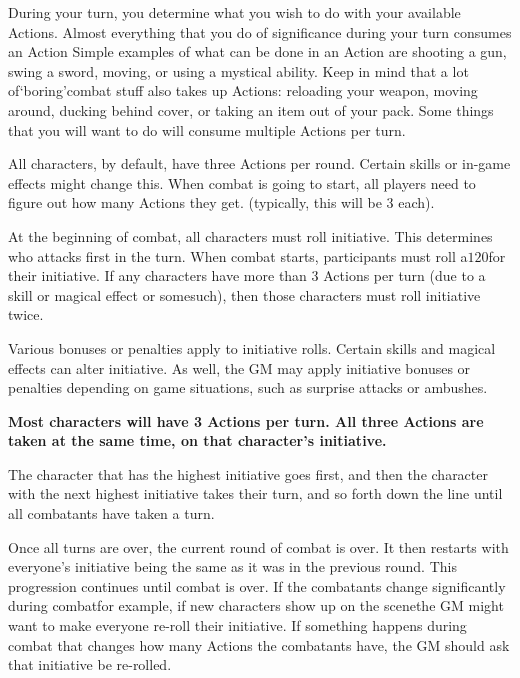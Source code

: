 \documentclass[twoside]{book}
\begin{document}
    {  
    During your turn, you determine what you wish to do with your available Actions. Almost everything that you do of significance during your turn consumes an Action Simple examples of what can be done in an Action are shooting a gun, swing a sword, moving, or using a mystical ability. Keep in mind that a lot of`boring'combat stuff also takes up Actions: reloading your weapon, moving around, ducking behind cover, or taking an item out of your pack. Some things that you will want to do will consume multiple Actions per turn.
    }
  
    {  
    All characters, by default, have three Actions per round. Certain skills or in-game effects might change this. When combat is going to start, all players need to figure out how many Actions they get. (typically, this will be 3 each).
    }
  
    {  
    At the beginning of combat, all characters must roll initiative. This determines who attacks first in the turn. When combat starts, participants must roll a\ensuremath{1}\ensuremath{20}\ensuremath{}for their initiative. If any characters have more than 3 Actions per turn (due to a skill or magical effect or somesuch), then those characters must roll initiative twice.
    }
  
    {  
    Various bonuses or penalties apply to initiative rolls. Certain skills and magical effects can alter initiative. As well, the GM may apply initiative bonuses or penalties depending on game situations, such as surprise attacks or ambushes.
    }
  

 \textbf{Most characters will have 3 Actions per turn. All three Actions are taken at the same time, on that character's initiative.}


  

  

  
    {  
    The character that has the highest initiative goes first, and then the character with the next highest initiative takes their turn, and so forth down the line until all combatants have taken a turn.
    }
  
    {  
    Once all turns are over, the current round of combat is over. It then restarts with everyone's initiative being the same as it was in the previous round. This progression continues until combat is over. If the combatants change significantly during combatfor example, if new characters show up on the scenethe GM might want to make everyone re-roll their initiative. If something happens during combat that changes how many Actions the combatants have, the GM should ask that initiative be re-rolled.
    }
  
\end{document}
